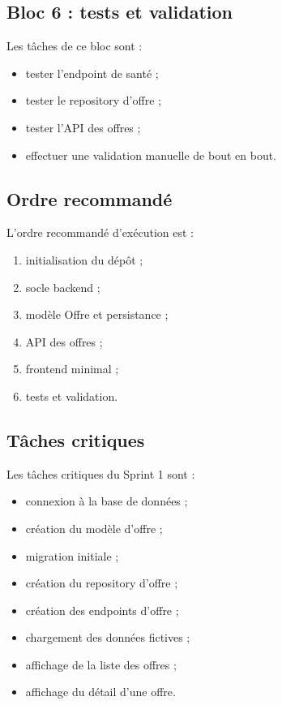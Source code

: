 \documentclass[11pt,a4paper]{article}
\begin{document}
\subsection{Bloc 6 : tests et validation}

Les tâches de ce bloc sont :

\begin{itemize}
    \item tester l’endpoint de santé ;
    \item tester le repository d’offre ;
    \item tester l’API des offres ;
    \item effectuer une validation manuelle de bout en bout.
\end{itemize}

\subsection{Ordre recommandé}

L’ordre recommandé d’exécution est :

\begin{enumerate}
    \item initialisation du dépôt ;
    \item socle backend ;
    \item modèle Offre et persistance ;
    \item API des offres ;
    \item frontend minimal ;
    \item tests et validation.
\end{enumerate}

\subsection{Tâches critiques}

Les tâches critiques du Sprint 1 sont :

\begin{itemize}
    \item connexion à la base de données ;
    \item création du modèle d’offre ;
    \item migration initiale ;
    \item création du repository d’offre ;
    \item création des endpoints d’offre ;
    \item chargement des données fictives ;
    \item affichage de la liste des offres ;
    \item affichage du détail d’une offre.
\end{itemize}
\end{document}
